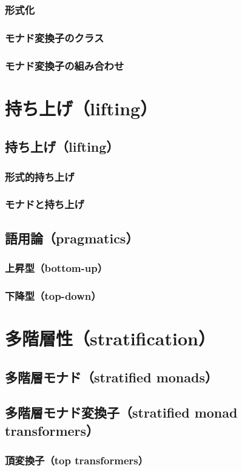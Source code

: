 \documentclass[11pt, oneside]{jsarticle}   	%
\begin{document}
\subsubsection{  形式化 }
\subsubsection{ モナド変換子のクラス }
\subsubsection{ モナド変換子の組み合わせ }
\section{ 持ち上げ（lifting）}
\subsection{ 持ち上げ（lifting） }
\subsubsection{  形式的持ち上げ }
\subsubsection{ モナドと持ち上げ }
\subsection{ 語用論（pragmatics） }
\subsubsection{ 上昇型（bottom-up） }
\subsubsection{ 下降型（top-down） }
\section{ 多階層性（stratification）}
\subsection{ 多階層モナド（stratified monads） }
\subsection{ 多階層モナド変換子（stratified monad transformers） }
\subsubsection{ 頂変換子（top transformers） }
\end{document}
